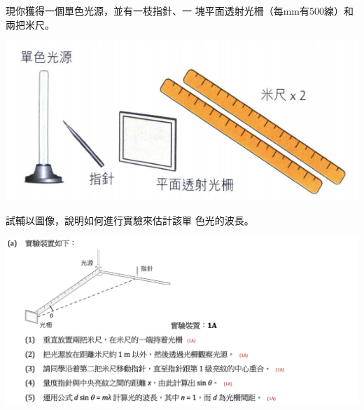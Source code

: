 {
    現你獲得一個單色光源，並有一枝指針、一 塊平面透射光柵（每mm有500線）和兩把米尺。
    \par{\par\centering\includegraphics[width=.45\textwidth]{./img/ch4_earlyclass_wave_lq_2024-05-14-14-17-02.png}\par}
    試輔以圖像，說明如何進行實驗來估計該單 色光的波長。
}{
    \sol \par{\par\centering\includegraphics[width=\textwidth]{./img/ch4_earlyclass_wave_lq_2024-05-14-14-18-08.png}\par}
}

